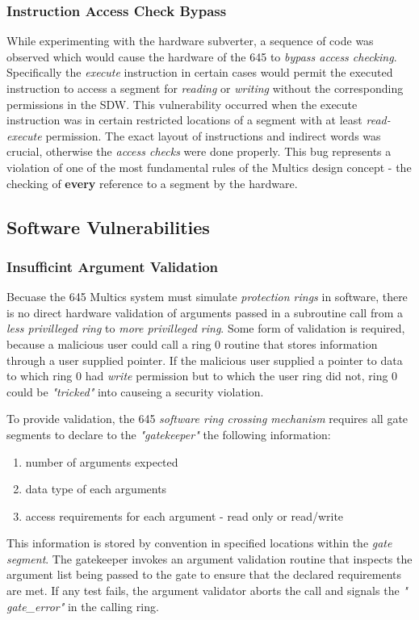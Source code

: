 \subsubsection{Instruction Access Check Bypass}

While experimenting with the hardware subverter, a sequence of code was observed which would cause the hardware 
of the 645 to \textit{bypass access checking}. Specifically the \textit{execute} instruction in certain cases 
would permit the executed instruction to access a segment for \textit{reading} or \textit{writing} without the 
corresponding permissions in the SDW.
This vulnerability occurred when the execute instruction was in certain restricted locations of a segment with 
at least \textit{read-execute} permission.
The exact layout of instructions and indirect words was crucial, otherwise the \textit{access checks} were done 
properly.
This bug represents a violation of one of the most fundamental rules of the Multics design concept - the checking 
of \textbf{every} reference to a segment by the hardware.

\subsection{Software Vulnerabilities}

\subsubsection{Insufficint Argument Validation}

Becuase the 645 Multics system must simulate \textit{protection rings} in software, there is no direct hardware 
validation of arguments passed in a subroutine call from a \textit{less privilleged ring} to \textit{more 
privilleged ring}. Some form of validation is required, because a malicious user could call a ring 0 routine 
that stores information through a user supplied pointer.
If the malicious user supplied a pointer to data to which ring 0 had \textit{write} permission but to which the 
user ring did not, ring 0 could be \textit{"tricked"} into causeing a security violation.

To provide validation, the 645 \textit{software ring crossing mechanism} requires all gate segments to declare to 
the \textit{"gatekeeper"} the following information:
\begin{enumerate}
    \item number of arguments expected
    \item data type of each arguments
    \item access requirements for each argument - read only or read/write
\end{enumerate} 
This information is stored by convention in specified locations within the \textit{gate segment}. The gatekeeper 
invokes an argument validation routine that inspects the argument list being passed to the gate to ensure that the 
declared requirements are met. If any test fails, the argument validator aborts the call and signals the \textit{"
gate_error"} in the calling ring.

